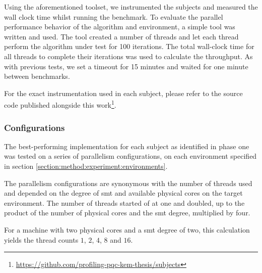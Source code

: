 Using the aforementioned toolset, we instrumented the subjects and measured the wall clock time whilst running the benchmark. To evaluate the parallel performance behavior of the algorithm and environment, a simple tool was written and used. The tool created a number of threads and let each thread perform the algorithm under test for 100 iterations. The total wall-clock time for all threads to complete their iterations was used to calculate the throughput. As with previous tests, we set a timeout for 15 minutes and waited for one minute between benchmarks.

For the exact instrumentation used in each subject, please refer to the source code published alongside this work\footnote{\href{https://github.com/profiling-pqc-kem-thesis/subjects}{https://github.com/profiling-pqc-kem-thesis/subjects}}.

\subsubsection{Configurations}
\label{section:method:experiment:phase2:configurations}

The best-performing implementation for each subject as identified in phase one was tested on a series of parallelism configurations, on each environment specified in section \ref{section:method:experiment:environments}.

The parallelism configurations are synonymous with the number of threads used and depended on the degree of \gls{smt} and available physical cores on the target environment. The number of threads started of at one and doubled, up to the product of the number of physical cores and the \gls{smt} degree, multiplied by four.

For a machine with two physical cores and a \gls{smt} degree of two, this calculation yields the thread counts $1$, $2$, $4$, $8$ and $16$.
